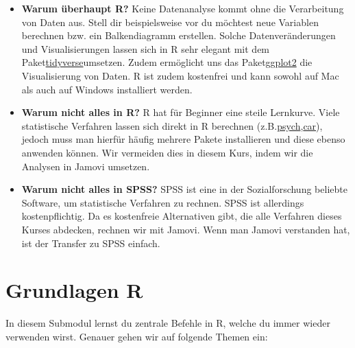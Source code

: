 \documentclass[
]{book}
\begin{document}
\begin{itemize}
\item
  \textbf{Warum überhaupt R?} Keine Datenanalyse kommt ohne die Verarbeitung von Daten aus. Stell dir beispielsweise vor du möchtest neue Variablen berechnen bzw. ein Balkendiagramm erstellen. Solche Datenveränderungen und Visualisierungen lassen sich in R sehr elegant mit dem Paket\href{https://www.tidyverse.org/}{tidyverse}umsetzen. Zudem ermöglicht uns das Paket\href{https://ggplot2.tidyverse.org/}{ggplot2} die Visualisierung von Daten. R ist zudem kostenfrei und kann sowohl auf Mac als auch auf Windows installiert werden.
\item
  \textbf{Warum nicht alles in R?} R hat für Beginner eine steile Lernkurve. Viele statistische Verfahren lassen sich direkt in R berechnen (z.B.\href{https://cran.r-project.org/web/packages/psych/index.html}{psych},\href{https://cran.r-project.org/web/packages/car/index.html}{car}), jedoch muss man hierfür häufig mehrere Pakete installieren und diese ebenso anwenden können. Wir vermeiden dies in diesem Kurs, indem wir die Analysen in Jamovi umsetzen.
\item
  \textbf{Warum nicht alles in SPSS?} SPSS ist eine in der Sozialforschung beliebte Software, um statistische Verfahren zu rechnen. SPSS ist allerdings kostenpflichtig. Da es kostenfreie Alternativen gibt, die alle Verfahren dieses Kurses abdecken, rechnen wir mit Jamovi. Wenn man Jamovi verstanden hat, ist der Transfer zu SPSS einfach.
\end{itemize}

\hypertarget{grundlagen-r}{%
\section{Grundlagen R}\label{grundlagen-r}}

In diesem Submodul lernst du zentrale Befehle in R, welche du immer wieder verwenden wirst. Genauer gehen wir auf folgende Themen ein:
\end{document}
